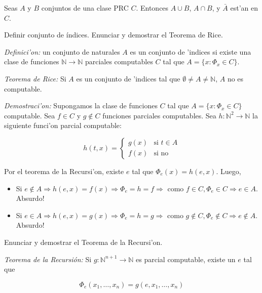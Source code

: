 \begin{questions}
\begin{solution}
\end{solution}

\question Seas $A$ y $B$ conjuntos de una clase PRC $C$. Entonces $A\cup B$, $A\cap B$, y $\bar{A}$ est'an en $C$.

\question Definir conjunto de índices. Enunciar y demostrar el Teorema de Rice.
\begin{solution}
  
  {\it Definici'on:} un conjunto de naturales $A$ es un conjunto de 'indices si existe una clase de funciones $\mathbb{N} \rightarrow \mathbb{N}$ parciales computables $C$ tal que $A = \{ x : \Phi_x \in C \}$. 

  {\it Teorema de Rice:} Si $A$ es un conjunto de 'indices tal que $\emptyset \neq A \neq \mathbb{N}$, $A$ no es computable. 

  {\it Demostraci'on:} Supongamos la clase de funciones $C$ tal que $A = \{ x : \Phi_x \in C \}$ computable. Sea $f \in C$ y $g \notin C$ funciones parciales computables. Sea $h : \mathbb{N}^2 \rightarrow \mathbb{N}$ la siguiente funci'on parcial computable: 

  $$
  h(t,x) = \left\{
  \begin{array}{cl}
  g(x) & \mbox{si } t \in A \\
  f(x) & \mbox{si no}
  \end{array}\right.
  $$

  Por el teorema de la Recursi'on, existe $e$ tal que $\Phi_e(x) = h(e,x)$. Luego, 

  \begin{itemize}
  \item Si $e\notin A \Rightarrow h(e,x) = f(x)\Rightarrow \Phi_e=h=f\Rightarrow$ como $f\in C, \Phi_e \in C \Rightarrow e \in A$. Absurdo! 
  \item Si $e\in A \Rightarrow h(e,x) = g(x)\Rightarrow \Phi_e=h=g\Rightarrow$ como $g\notin C, \Phi_e \notin C \Rightarrow e \notin A$. Absurdo! 
  \end{itemize}

  \end{solution}

  \question Enunciar y demostrar el Teorema de la Recursi'on.
  \begin{solution}
  
  {\it Teorema de la Recursi\'on:} Si $g : \mathbb{N}^{n+1} \rightarrow \mathbb{N}$ es parcial computable, existe un $e$ tal que

  \begin{equation*}
  \Phi_e(x_1, \dots, x_n) = g(e, x_1, \dots, x_n)
  \end{equation*}


\end{solution}
\end{questions}
